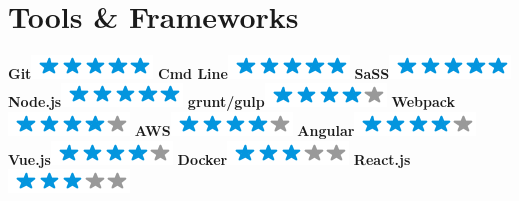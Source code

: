\documentclass[]{friggeri-cv}
\begin{document}
\begin{aside}
~
~
~
  \section{Tools \& Frameworks}
    \textbf{Git}\includegraphics[scale=0.40]{img/5stars.png}
    \textbf{Cmd Line}\includegraphics[scale=0.40]{img/5stars.png}
    \textbf{SaSS}\includegraphics[scale=0.40]{img/5stars.png}
    \textbf{Node.js}\includegraphics[scale=0.40]{img/5stars.png}
     \textbf{grunt/gulp}\includegraphics[scale=0.40]{img/4stars.png}
     \textbf{Webpack}\includegraphics[scale=0.40]{img/4stars.png}
     \textbf{AWS}\includegraphics[scale=0.40]{img/4stars.png}
     \textbf{Angular}\includegraphics[scale=0.40]{img/4stars.png}
     \textbf{Vue.js}\includegraphics[scale=0.40]{img/4stars.png}
      \textbf{Docker}\includegraphics[scale=0.40]{img/3stars.png}
     \textbf{React.js}\includegraphics[scale=0.40]{img/3stars.png}


\end{aside}
\end{document}
